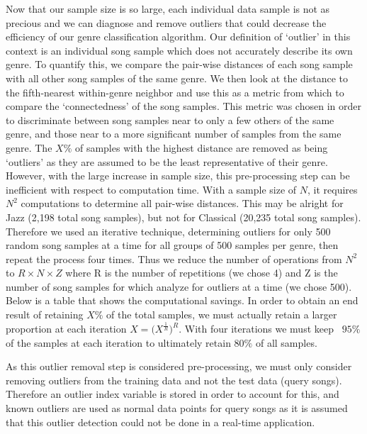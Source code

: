 \documentclass[10pt]{article}
\begin{document}
Now that our sample size is so large, each individual data sample is not as precious and we can diagnose and remove outliers that could decrease the efficiency of our genre classification algorithm.  Our definition of ‘outlier’ in this context is an individual song sample which does not accurately describe its own genre.  To quantify this, we compare the pair-wise distances of each song sample with all other song samples of the same genre.  We then look at the distance to the fifth-nearest within-genre neighbor and use this as a metric from which to compare the ‘connectedness’ of the song samples.  This metric was chosen in order to discriminate between song samples near to only a few others of the same genre, and those near to a more significant number of samples from the same genre.  The $X\%$ of samples with the highest distance are removed as being ‘outliers’ as they are assumed to be the least representative of their genre.
However, with the large increase in sample size, this pre-processing step can be inefficient with respect to computation time.  With a sample size of $N$, it requires $N^2$ computations to determine all pair-wise distances.  This may be alright for Jazz (2,198 total song samples), but not for Classical (20,235 total song samples).  Therefore we used an iterative technique, determining outliers for only 500 random song samples at a time for all groups of 500 samples per genre, then repeat the process four times.  Thus we reduce the number of operations from $N^2$ to $R \times N \times Z$ where R is the number of repetitions (we chose 4) and Z is the number of song samples for which analyze for outliers at a time (we chose 500).  Below is a table that shows the computational savings.  In order to obtain an end result of retaining $X\%$ of the total samples, we must actually retain a larger proportion at each iteration $X = \big(X^{\frac{1}{R}} \big)^R $.  With four iterations we must keep ~$95\%$ of the samples at each iteration to ultimately retain $80\%$ of all samples.  



As this outlier removal step is considered pre-processing, we must only consider removing outliers from the training data and not the test data (query songs).  Therefore an outlier index variable is stored in order to account for this, and known outliers are used as normal data points for query songs as it is assumed that this outlier detection could not be done in a real-time application.
\end{document}
